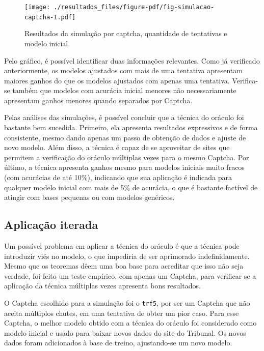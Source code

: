 \documentclass[12pt,twoside,brazilian]{book}
\begin{document}
\begin{figure}

{\centering \texttt{[image: ./resultados\_files/figure-pdf/fig-simulacao-captcha-1.pdf]}

}

\caption{\label{fig-simulacao-captcha}Resultados da simulação por
captcha, quantidade de tentativas e modelo inicial.}

\end{figure}

Pelo gráfico, é possível identificar duas informações relevantes. Como
já verificado anteriormente, os modelos ajustados com mais de uma
tentativa apresentam maiores ganhos do que os modelos ajustados com
apenas uma tentativa. Verifica-se também que modelos com acurácia
inicial menores não necessariamente apresentam ganhos menores quando
separados por Captcha.

Pelas análises das simulações, é possível concluir que a técnica do
oráculo foi bastante bem sucedida. Primeiro, ela apresenta resultados
expressivos e de forma consistente, mesmo dando apenas um passo de
obtenção de dados e ajuste de novo modelo. Além disso, a técnica é capaz
de se aproveitar de sites que permitem a verificação do oráculo
múltiplas vezes para o mesmo Captcha. Por último, a técnica apresenta
ganhos mesmo para modelos iniciais muito fracos (com acurácias de até
10\%), indicando que sua aplicação é indicada para qualquer modelo
inicial com mais de 5\% de acurácia, o que é bastante factível de
atingir com bases pequenas ou com modelos genéricos.

\hypertarget{aplicauxe7uxe3o-iterada}{%
\subsection{Aplicação iterada}\label{aplicauxe7uxe3o-iterada}}

Um possível problema em aplicar a técnica do oráculo é que a técnica
pode introduzir viés no modelo, o que impediria de ser aprimorado
indefinidamente. Mesmo que os teoremas dêem uma boa base para acreditar
que isso não seja verdade, foi feito um teste empírico, com apenas um
Captcha, para verificar se a aplicação da técnica múltiplas vezes
apresenta bons resultados.

O Captcha escolhido para a simulação foi o \texttt{trf5}, por ser um
Captcha que não aceita múltiplos chutes, em uma tentativa de obter um
pior caso. Para esse Captcha, o melhor modelo obtido com a técnica do
oráculo foi considerado como modelo inicial e usado para baixar novos
dados do site do Tribunal. Os novos dados foram adicionados à base de
treino, ajustando-se um novo modelo.
\end{document}
